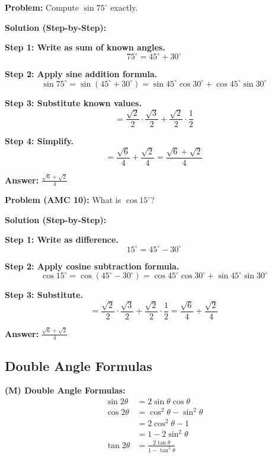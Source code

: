 \documentclass[12pt]{extarticle}
\begin{document}
\begin{examplebox}
\textbf{Problem:} Compute $\sin 75^\circ$ exactly.

\textbf{Solution (Step-by-Step):}

\textbf{Step 1: Write as sum of known angles.}
\[
75^\circ = 45^\circ + 30^\circ
\]

\textbf{Step 2: Apply sine addition formula.}
\[
\sin 75^\circ = \sin(45^\circ + 30^\circ) = \sin 45^\circ \cos 30^\circ + \cos 45^\circ \sin 30^\circ
\]

\textbf{Step 3: Substitute known values.}
\[
= \frac{\sqrt{2}}{2} \cdot \frac{\sqrt{3}}{2} + \frac{\sqrt{2}}{2} \cdot \frac{1}{2}
\]

\textbf{Step 4: Simplify.}
\[
= \frac{\sqrt{6}}{4} + \frac{\sqrt{2}}{4} = \frac{\sqrt{6} + \sqrt{2}}{4}
\]

\textbf{Answer:} $\boxed{\frac{\sqrt{6} + \sqrt{2}}{4}}$
\end{examplebox}

\begin{examplebox}
\textbf{Problem (AMC 10):} What is $\cos 15^\circ$?

\textbf{Solution (Step-by-Step):}

\textbf{Step 1: Write as difference.}
\[
15^\circ = 45^\circ - 30^\circ
\]

\textbf{Step 2: Apply cosine subtraction formula.}
\[
\cos 15^\circ = \cos(45^\circ - 30^\circ) = \cos 45^\circ \cos 30^\circ + \sin 45^\circ \sin 30^\circ
\]

\textbf{Step 3: Substitute.}
\[
= \frac{\sqrt{2}}{2} \cdot \frac{\sqrt{3}}{2} + \frac{\sqrt{2}}{2} \cdot \frac{1}{2} = \frac{\sqrt{6}}{4} + \frac{\sqrt{2}}{4}
\]

\textbf{Answer:} $\boxed{\frac{\sqrt{6} + \sqrt{2}}{4}}$
\end{examplebox}

\subsection{Double Angle Formulas}

\begin{theorembox}
\textbf{(M) Double Angle Formulas:}
\begin{align}
\sin 2\theta &= 2\sin\theta\cos\theta \\
\cos 2\theta &= \cos^2\theta - \sin^2\theta \\
&= 2\cos^2\theta - 1 \\
&= 1 - 2\sin^2\theta \\
\tan 2\theta &= \frac{2\tan\theta}{1 - \tan^2\theta}
\end{align}
\end{theorembox}
\end{document}
